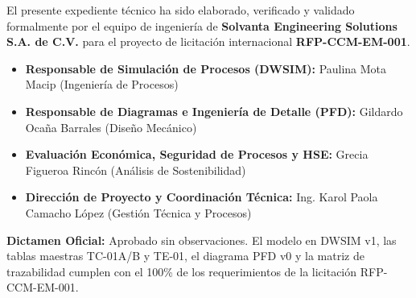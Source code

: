 \documentclass[11pt,letterpaper]{article}
\begin{document}
\vspace{0.8cm}
\begin{tcolorbox}[colback=navyblue!5!white,colframe=navyblue,title=\textbf{Aprobación y Validación Técnica del Expediente E1.5},fonttitle=\bfseries]
\small
El presente expediente técnico ha sido elaborado, verificado y validado formalmente por el equipo de ingeniería de \textbf{Solvanta Engineering Solutions S.A. de C.V.} para el proyecto de licitación internacional \textbf{RFP-CCM-EM-001}.

\begin{itemize}[itemsep=2pt,topsep=2pt]
    \item \textbf{Responsable de Simulación de Procesos (DWSIM):} Paulina Mota Macip (Ingeniería de Procesos)
    \item \textbf{Responsable de Diagramas e Ingeniería de Detalle (PFD):} Gildardo Ocaña Barrales (Diseño Mecánico)
    \item \textbf{Evaluación Económica, Seguridad de Procesos y HSE:} Grecia Figueroa Rincón (Análisis de Sostenibilidad)
    \item \textbf{Dirección de Proyecto y Coordinación Técnica:} Ing. Karol Paola Camacho López (Gestión Técnica y Procesos)
\end{itemize}

\vspace{0.2cm}
\textbf{Dictamen Oficial:} Aprobado sin observaciones. El modelo en DWSIM v1, las tablas maestras TC-01A/B y TE-01, el diagrama PFD v0 y la matriz de trazabilidad cumplen con el 100\% de los requerimientos de la licitación RFP-CCM-EM-001.
\end{tcolorbox}

\vspace{0.4cm}
\end{document}
